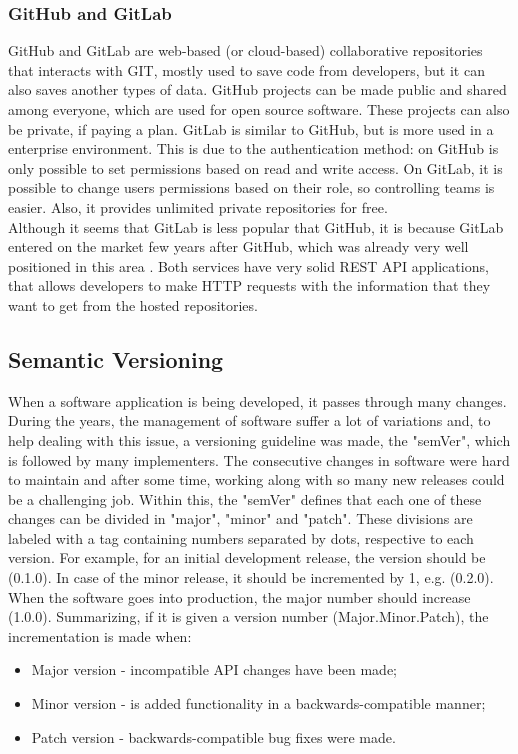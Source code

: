 \documentclass[mim_thesis.tex]{subfiles}
\begin{document}
\newpage
\subsubsection{GitHub and GitLab}

GitHub and GitLab are web-based (or cloud-based) collaborative repositories that interacts with GIT, mostly used to save code from developers, but it can also saves another types of data. GitHub projects can be made public and shared among everyone, which are used for open source software. These projects can also be private, if paying a plan. GitLab is similar to GitHub, but is more used in a enterprise environment. This is due to the authentication method: on GitHub is only possible to set permissions based on read and write access. On GitLab, it is possible to change users permissions based on their role, so controlling teams is easier. Also, it provides unlimited private repositories for free. \\

Although it seems that GitLab is less popular that GitHub, it is because GitLab entered on the market few years after GitHub, which was already very well positioned in this area \citep{thomas2017git}. Both services have very solid REST API applications, that allows developers to make HTTP requests with the information that they want to get from the hosted repositories. 


\subsection{Semantic Versioning}
When a software application is being developed, it passes through many changes. During the years, the management of software suffer a lot of variations and, to help dealing with this issue, a versioning guideline was made, the "semVer", which is followed by many implementers. The consecutive changes in software were hard to maintain and after some time, working along with so many new releases could be a challenging job. Within this, the "semVer" defines that each one of these changes can be divided in "major", "minor" and "patch". These divisions are labeled with a tag containing numbers separated by dots, respective to each version. For example, for an initial development release, the version should be (0.1.0). In case of the minor release, it should be incremented by 1, e.g. (0.2.0). When the software goes into production, the major number should increase (1.0.0). Summarizing, if it is given a version number (Major.Minor.Patch), the incrementation is made when: \citep{preston2018}
\begin{itemize} [noitemsep]
\item Major version - incompatible API changes have been made;
\item Minor version - is added functionality in a backwards-compatible manner;
\item Patch version - backwards-compatible bug fixes were made.
\end{itemize}
\end{document}
